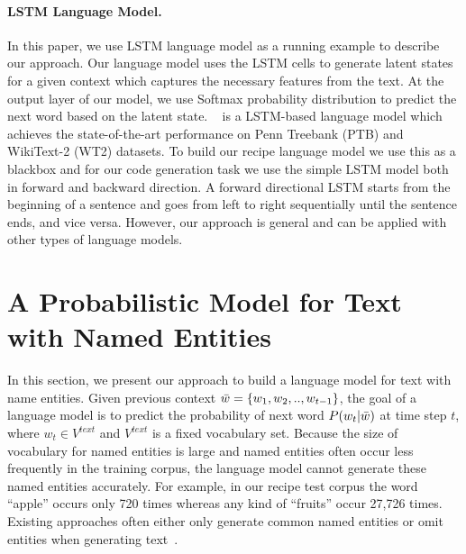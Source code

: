 \documentclass[11pt,a4paper]{article}
\begin{document}
\paragraph{\bf LSTM Language Model.}
In this paper, we use LSTM language model as a running example to describe our approach.
Our language model uses the LSTM cells to generate latent states for a given context which captures the necessary features from the text. At the output layer of our model, we use Softmax probability distribution to predict the next word based on the latent state. ~ is a LSTM-based language model which achieves the state-of-the-art performance on Penn Treebank (PTB) and WikiText-2 (WT2) datasets. To build our recipe language model we use this as a blackbox and for our code generation task we use the simple LSTM model both in forward and backward direction. A forward directional LSTM starts from the beginning of a sentence and goes from left to right sequentially until the sentence ends, and vice versa. However, our approach is general and can be applied with other types of language models. 












 


\section{A Probabilistic Model for Text with Named Entities}
In this section, we present our approach to build a language model for text with name entities. Given previous context  $\Bar{w} = \{w_1, w_2, .., w_{t-1}\}$, the goal of a language model is to predict the probability of next word $P(w_t | \Bar{w})$ at time step $t$, where $w_t\in V^{text}$ and $V^{text}$ is a fixed vocabulary set. 
Because the size of vocabulary for named entities is large and  named entities often occur less frequently in the training corpus, the language model cannot generate these named entities accurately. For example, in our recipe test corpus the word ``apple'' occurs only 720 times whereas any kind of ``fruits'' occur 27,726 times.  Existing approaches often either only generate common named entities or omit entities when generating text~\cite{jozefowicz2016exploring}. 
\end{document}
